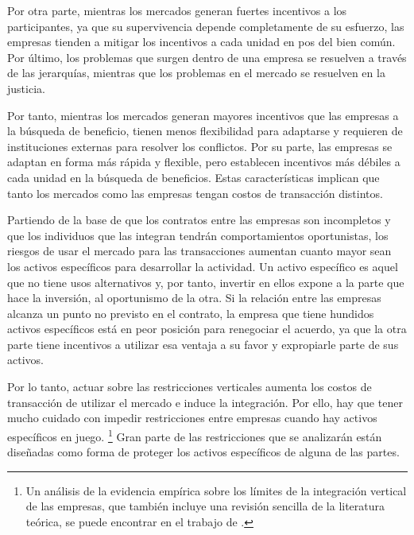 \documentclass[
  12pt,
  spanish,
]{book}
\begin{document}
Por otra parte, mientras los mercados generan fuertes incentivos a los participantes, ya que su supervivencia depende completamente de su esfuerzo, las empresas tienden a mitigar los incentivos a cada unidad en pos del bien común. Por último, los problemas que surgen dentro de una empresa se resuelven a través de las jerarquías, mientras que los problemas en el mercado se resuelven en la justicia.

Por tanto, mientras los mercados generan mayores incentivos que las empresas a la búsqueda de beneficio, tienen menos flexibilidad para adaptarse y requieren de instituciones externas para resolver los conflictos. Por su parte, las empresas se adaptan en forma más rápida y flexible, pero establecen incentivos más débiles a cada unidad en la búsqueda de beneficios. Estas características implican que tanto los mercados como las empresas tengan
costos de transacción distintos.

Partiendo de la base de que los contratos entre las empresas son incompletos y que los individuos que las integran tendrán comportamientos oportunistas, los riesgos de usar el mercado para las transacciones aumentan cuanto mayor sean los activos específicos para desarrollar la actividad. Un activo específico es aquel que no tiene usos alternativos y, por tanto, invertir en ellos expone a la parte que hace la inversión, al oportunismo de la otra. Si la relación entre las empresas alcanza un punto no previsto en el contrato, la empresa que tiene hundidos activos específicos está en peor posición para renegociar el acuerdo, ya que la otra parte tiene incentivos a utilizar esa ventaja a su favor y expropiarle parte de sus activos.

Por lo tanto, actuar sobre las restricciones verticales aumenta los costos de transacción de utilizar el mercado e induce la integración. Por ello, hay que tener mucho cuidado con impedir restricciones entre empresas cuando hay activos específicos en juego.
\footnote{Un análisis de la evidencia empírica sobre los límites de la integración vertical de las empresas, que también incluye una revisión sencilla de la literatura teórica, se puede encontrar en el trabajo de \citet{Lafontaine2007}.}
Gran parte de las restricciones que se analizarán están diseñadas como forma de proteger los activos específicos de alguna de las partes.
\end{document}
